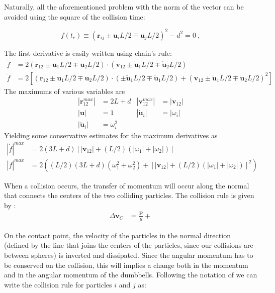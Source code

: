 \documentclass[aps,pre,onecolumn,preprint,showpacs]{revtex4}
\begin{document}
Naturally, all the aforementioned problem with the norm of the vector can be avoided using the
square of the  collision time:

\begin{equation}
  \label{eq:f}
  f(t_c) \equiv (\mathbf{r}_{ij} \pm \mathbf{u}_{i}L/2 \mp \mathbf{u}_{j}L/2)^2 - d^2 = 0~,
\end{equation}

The first derivative is easily written using chain's rule:
\begin{align}
  \dot{f} &= 2(\mathbf{r}_{12} \pm \mathbf{u}_1 L/2 \mp \mathbf{u}_2 L/2)\cdot(\mathbf{v}_{12} \pm \dot{\mathbf{u}}_1 L/2 \mp \dot{\mathbf{u}}_2 L/2)\\
  \ddot{f} &=2 \left[ (\mathbf{r}_{12} \pm \mathbf{u}_1 L/2 \mp \mathbf{u}_2L/2)
    \cdot(\pm\ddot{\mathbf{u}}_1 L/2 \mp \ddot{\mathbf{u}}_1L/2 )
    + (\mathbf{v}_{12} \pm \dot{\mathbf{u}}_1 L/2 \mp \dot{\mathbf{u}}_2 L/2)^2 \right]
\end{align}
The maximums of various variables are
\begin{align*}
  \left|\mathbf{r}_{12}^{max}\right|&= 2L + d & \left|\mathbf{v}_{12}^{max}\right|&= \left| \mathbf{v}_{12}\right|\\ 
  \left|\mathbf{u}\right|&= 1 & \left|\dot{\mathbf{u}}_i\right|&= \left|\omega_i\right|\\
  \left|\ddot{\mathbf{u}}_i\right|&= \omega_i^2
\end{align*}
Yielding some conservative estimates for the maximum derivatives as
\begin{align}
  \left|\dot{f}\right|^{max} &= 2(3L + d)\left[\left|\mathbf{v}_{12}\right| +  (L / 2) (\left|\omega_1\right| + \left|\omega_2\right|)\right]\\
  \left|\ddot{f}\right|^{max} &=2 \left((L / 2) (3L + d) (\omega_1^2 +  \omega_2^2)
  + \left[\left|\mathbf{v}_{12}\right| + (L/2) \left(\left|\omega_1\right| + \left|\omega_2\right|\right)\right]^2 \right)
\end{align}

When a collision occurs, the transfer of momentum will occur along the
normal that connects the centers of the two colliding particles.  The
collision rule is given by \cite{Montaine,vanZon}:
\begin{align}
  \Delta \mathbf{v}_C &= \frac{\mathbf{P}}{\mu} + 
\end{align}


On the contact point, the velocity of the particles in the normal
direction (defined by the line that joins the centers of the
particles, since our collisions are between spheres) is inverted and
dissipated. Since the angular momentum has to be conserved on the
collision, this will implies a change both in the momentum and in the
angular momentum of the dumbbells. Following the notation of
\cite{vanZon} we can write the collision rule for particles $i$ and
$j$ as:
\end{document}
